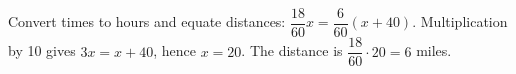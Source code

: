 Convert times to hours and equate distances: $\dfrac{18}{60}x=\dfrac{6}{60}(x+40)$. Multiplication by 10 gives $3x=x+40$, hence $x=20$. The distance is $\dfrac{18}{60}\cdot20=\boxed6$ miles.
